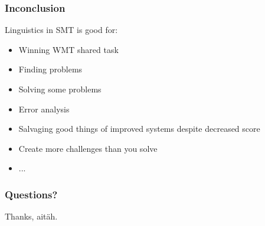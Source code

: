 \documentclass{beamer}
\begin{document}
\begin{frame}
    \frametitle{Inconclusion}
    Linguistics in SMT is good for:
    \begin{itemize}
        \item Winning WMT shared task
        \item Finding problems
        \item Solving some problems
        \item Error analysis
        \item Salvaging good things of improved
            systems despite decreased score
        \item Create more challenges than you solve
        \item ...
    \end{itemize}
\end{frame}

\begin{frame}
    \frametitle{Questions?}
    Thanks, aitäh.
\end{frame}
\end{document}
